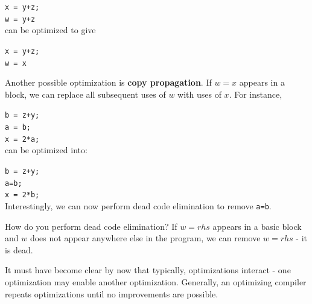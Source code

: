 \documentclass[12pt,letterpaper]{book}
\theoremstyle{definition}
\begin{document}
\texttt{x = y+z;}\\
\texttt{w = y+z} \\
can be optimized to give

\texttt{x = y+z;} \\
\texttt{w = x}

Another possible optimization is \textbf{copy propagation}. If $w = x$ appears in a block, we can replace all subsequent uses of $w$ with uses of $x$. For instance, 

\texttt{b = z+y;}\\
\texttt{a = b;}\\
\texttt{x = 2*a;}\\
can be optimized into:

\texttt{b = z+y;}\\
\texttt{a=b;}\\
\texttt{x = 2*b;}\\
Interestingly, we can now perform dead code elimination to remove \texttt{a=b}.

How do you perform dead code elimination? If $w = rhs$ appears in a basic block and $w$ does not appear anywhere else in the program, we can remove $w=rhs$ - it is dead.

It must have become clear by now that typically, optimizations interact - one optimization may enable another optimization. Generally, an optimizing compiler repeats optimizations until no improvements are possible.
\end{document}
